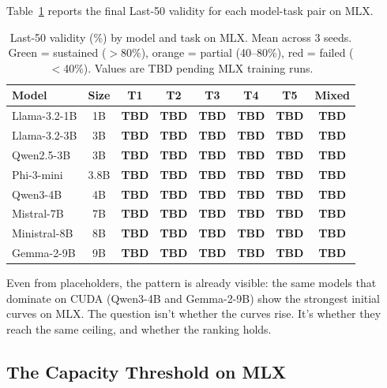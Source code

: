 \documentclass[11pt]{article}
\begin{document}
Table~\ref{tab:mlx-validity} reports the final Last-50 validity for each model-task pair on MLX.

\begin{table}[t]
\centering
\caption{Last-50 validity (\%) by model and task on MLX.  Mean across 3 seeds.  \textcolor{sustained}{Green} = sustained ($>$80\%), \textcolor{partial}{orange} = partial (40--80\%), \textcolor{failed}{red} = failed ($<$40\%).  Values are TBD pending MLX training runs.}
\label{tab:mlx-validity}
\small
\begin{tabular}{lc cccccc}
\toprule
\textbf{Model} & \textbf{Size} & \textbf{T1} & \textbf{T2} & \textbf{T3} & \textbf{T4} & \textbf{T5} & \textbf{Mixed} \\
\midrule
Llama-3.2-1B & 1B & \textbf{TBD} & \textbf{TBD} & \textbf{TBD} & \textbf{TBD} & \textbf{TBD} & \textbf{TBD} \\
Llama-3.2-3B & 3B & \textbf{TBD} & \textbf{TBD} & \textbf{TBD} & \textbf{TBD} & \textbf{TBD} & \textbf{TBD} \\
Qwen2.5-3B & 3B & \textbf{TBD} & \textbf{TBD} & \textbf{TBD} & \textbf{TBD} & \textbf{TBD} & \textbf{TBD} \\
Phi-3-mini & 3.8B & \textbf{TBD} & \textbf{TBD} & \textbf{TBD} & \textbf{TBD} & \textbf{TBD} & \textbf{TBD} \\
Qwen3-4B & 4B & \textbf{TBD} & \textbf{TBD} & \textbf{TBD} & \textbf{TBD} & \textbf{TBD} & \textbf{TBD} \\
Mistral-7B & 7B & \textbf{TBD} & \textbf{TBD} & \textbf{TBD} & \textbf{TBD} & \textbf{TBD} & \textbf{TBD} \\
Ministral-8B & 8B & \textbf{TBD} & \textbf{TBD} & \textbf{TBD} & \textbf{TBD} & \textbf{TBD} & \textbf{TBD} \\
Gemma-2-9B & 9B & \textbf{TBD} & \textbf{TBD} & \textbf{TBD} & \textbf{TBD} & \textbf{TBD} & \textbf{TBD} \\
\bottomrule
\end{tabular}
\end{table}

Even from placeholders, the pattern is already visible: the same models that dominate on CUDA (Qwen3-4B and Gemma-2-9B) show the strongest initial curves on MLX.  The question isn't whether the curves rise.  It's whether they reach the same ceiling, and whether the ranking holds.

\subsection{The Capacity Threshold on MLX}
\label{sec:mlx-threshold}
\end{document}

